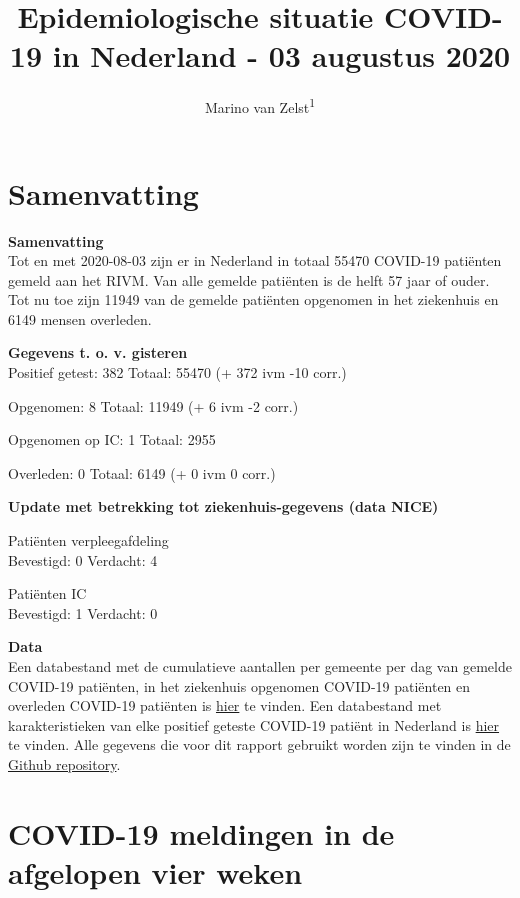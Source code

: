 \documentclass[
  english,
  man,floatsintext]{apa6}
\title{Epidemiologische situatie COVID-19 in Nederland - 03 augustus 2020}
\author{Marino van Zelst\textsuperscript{1}}
\date{}
\affiliation{\vspace{0.5cm}\textsuperscript{1} -}
\begin{document}
\maketitle

{
\hypersetup{linkcolor=}
\setcounter{tocdepth}{3}
\tableofcontents
}
\newpage

\hypertarget{samenvatting}{%
\section{Samenvatting}\label{samenvatting}}

\textbf{Samenvatting}\\
Tot en met 2020-08-03 zijn er in Nederland in totaal 55470 COVID-19 patiënten gemeld aan het RIVM. Van alle gemelde patiënten is de helft 57 jaar of ouder. Tot nu toe zijn 11949 van de gemelde patiënten opgenomen in het ziekenhuis en 6149 mensen overleden.

\textbf{Gegevens t. o. v. gisteren}\\
Positief getest: 382
Totaal: 55470 (+ 372 ivm -10 corr.)

Opgenomen: 8
Totaal: 11949 (+
6 ivm -2 corr.)

Opgenomen op IC: 1
Totaal: 2955

Overleden: 0
Totaal: 6149 (+
0 ivm 0 corr.)

\textbf{Update met betrekking tot ziekenhuis-gegevens (data NICE)}

Patiënten verpleegafdeling\\
Bevestigd: 0 Verdacht: 4

Patiënten IC\\
Bevestigd: 1 Verdacht: 0

\textbf{Data}\\
Een databestand met de cumulatieve aantallen per gemeente per dag van gemelde COVID-19 patiënten, in het ziekenhuis opgenomen COVID-19 patiënten en overleden COVID-19 patiënten is \href{https://data.rivm.nl/geonetwork/srv/dut/catalog.search\#/metadata/1c0fcd57-1102-4620-9cfa-441e93ea5604}{hier} te vinden. Een databestand met karakteristieken van elke positief geteste COVID-19 patiënt in Nederland is \href{https://data.rivm.nl/geonetwork/srv/dut/catalog.search\#/metadata/2c4357c8-76e4-4662-9574-1deb8a73f724?tab=relations}{hier} te vinden. Alle gegevens die voor dit rapport gebruikt worden zijn te vinden in de \href{https://github.com/mzelst/covid-19}{Github repository}.

\newpage

\hypertarget{covid-19-meldingen-in-de-afgelopen-vier-weken}{%
\section{COVID-19 meldingen in de afgelopen vier weken}\label{covid-19-meldingen-in-de-afgelopen-vier-weken}}
\end{document}
